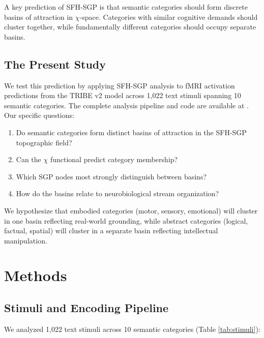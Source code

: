 \documentclass[12pt]{article}
\numberwithin{equation}{section}
\begin{document}
A key prediction of SFH-SGP is that semantic categories should form discrete basins of attraction in $\chi$-space. Categories with similar cognitive demands should cluster together, while fundamentally different categories should occupy separate basins.

\subsection{The Present Study}

We test this prediction by applying SFH-SGP analysis to fMRI activation predictions from the TRIBE v2 model \citep{dAscoli2026} across 1,022 text stimuli spanning 10 semantic categories. The complete analysis pipeline and code are available at \citep{SGPTribe3Code}. Our specific questions:

\begin{enumerate}
	\item Do semantic categories form distinct basins of attraction in the SFH-SGP topographic field?
	\item Can the $\chi$ functional predict category membership?
	\item Which SGP nodes most strongly distinguish between basins?
	\item How do the basins relate to neurobiological stream organization?
\end{enumerate}

We hypothesize that embodied categories (motor, sensory, emotional) will cluster in one basin reflecting real-world grounding, while abstract categories (logical, factual, spatial) will cluster in a separate basin reflecting intellectual manipulation.

\section{Methods}

\subsection{Stimuli and Encoding Pipeline}

We analyzed 1,022 text stimuli across 10 semantic categories (Table \ref{tab:stimuli}):
\end{document}
